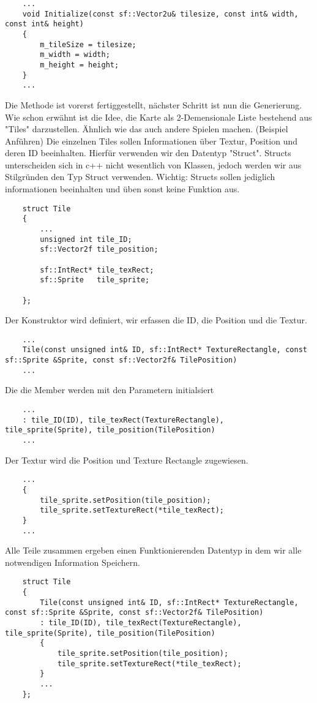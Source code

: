 \begin{lstlisting}
	...
	void Initialize(const sf::Vector2u& tilesize, const int& width, const int& height)
	{
		m_tileSize = tilesize;
		m_width = width; 
		m_height = height; 
	}
	...
\end{lstlisting}


Die Methode ist vorerst fertiggestellt, nächster Schritt ist nun die Generierung. Wie schon erwähnt ist die Idee, die Karte als 2-Demensionale Liste bestehend aus "Tiles" darzustellen. Ähnlich wie das auch andere Spielen machen. (Beispiel Anführen) Die einzelnen Tiles sollen Informationen über Textur, Position und deren ID beeinhalten. Hierfür verwenden wir den Datentyp "Struct". Structs unterscheiden sich in c++ nicht wesentlich von Klassen, jedoch werden wir aus Stilgründen den Typ Struct verwenden. Wichtig: Structs sollen jediglich informationen beeinhalten und üben sonst keine Funktion aus. 



\begin{lstlisting}
	struct Tile
	{
		...
		unsigned int tile_ID;
		sf::Vector2f tile_position;
		
		sf::IntRect* tile_texRect;
		sf::Sprite   tile_sprite;
		
	};
\end{lstlisting}
	

Der Konstruktor wird definiert, wir erfassen die ID, die Position und die Textur. 
\begin{lstlisting}
	...
	Tile(const unsigned int& ID, sf::IntRect* TextureRectangle, const sf::Sprite &Sprite, const sf::Vector2f& TilePosition)
	...
\end{lstlisting}

Die die Member werden mit den Parametern initialsiert 
\begin{lstlisting}
	...
	: tile_ID(ID), tile_texRect(TextureRectangle), tile_sprite(Sprite), tile_position(TilePosition)
	...
\end{lstlisting}

Der Textur wird die Position und Texture Rectangle zugewiesen. 
\begin{lstlisting}
	...
	{
		tile_sprite.setPosition(tile_position);
		tile_sprite.setTextureRect(*tile_texRect); 
	}
	...
\end{lstlisting}

Alle Teile zusammen ergeben einen Funktionierenden Datentyp in dem wir alle notwendigen Information Speichern. 
\begin{lstlisting}
	struct Tile
	{
		Tile(const unsigned int& ID, sf::IntRect* TextureRectangle, const sf::Sprite &Sprite, const sf::Vector2f& TilePosition)
		: tile_ID(ID), tile_texRect(TextureRectangle), tile_sprite(Sprite), tile_position(TilePosition) 
		{
			tile_sprite.setPosition(tile_position);
			tile_sprite.setTextureRect(*tile_texRect); 
		}
		...
	};
\end{lstlisting}

